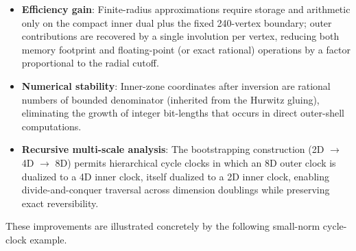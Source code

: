 \documentclass{article}
\begin{document}
\begin{itemize}
  \item \textbf{Efficiency gain}: Finite-radius approximations require storage and arithmetic only on the compact inner dual plus the fixed 240-vertex boundary; outer contributions are recovered by a single involution per vertex, reducing both memory footprint and floating-point (or exact rational) operations by a factor proportional to the radial cutoff.
  \item \textbf{Numerical stability}: Inner-zone coordinates after inversion are rational numbers of bounded denominator (inherited from the Hurwitz gluing), eliminating the growth of integer bit-lengths that occurs in direct outer-shell computations.
  \item \textbf{Recursive multi-scale analysis}: The bootstrapping construction (2D \(\to\) 4D \(\to\) 8D) permits hierarchical cycle clocks in which an 8D outer clock is dualized to a 4D inner clock, itself dualized to a 2D inner clock, enabling divide-and-conquer traversal across dimension doublings while preserving exact reversibility.
\end{itemize}
These improvements are illustrated concretely by the following small-norm cycle-clock example.
\end{document}
